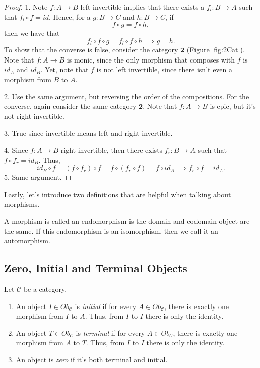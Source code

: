 \begin{proof}
	1. Note $f:A \to B$ left-invertible implies that there exists a $f_l:B \to A$ such that
	$f_l \circ f = id$. Hence, for a $g:B\to C$ and $h: B \to C$, if
	\begin{displaymath}
		f \circ g = f \circ h,
	\end{displaymath}
	then we have that
	\begin{displaymath}
		f_l \circ f \circ g = f_l \circ f \circ h \implies g =h.
	\end{displaymath}
	To show that the converse is false, consider the category $\mathbf{2}$ (Figure \ref{fig:2Cat}). Note that
	$f:A\to B$ is monic, since the only morphism that composes with $f$ is
	$id_A$ and $id_B$. Yet, note that $f$ is not left invertible, since there isn't even
	a morphism from $B$ to $A$.

	2. Use the same argument, but reversing the order of the compositions.
	For the converse, again consider the same category $\mathbf{2}$. Note that
	$f:A\to B$ is epic, but it's not right invertible.

	3. True since invertible means left and right invertible.

	4. Since $f:A \to B$ right invertible, then there exists $f_r:B \to A$
	such that $f \circ f_r = id_B$. Thus,
	\begin{displaymath}
		id_B \circ f = (f \circ f_r) \circ f =
		f \circ (f_r \circ f) =
		f \circ id_A \implies f_r \circ f = id_A.
	\end{displaymath}
	5. Same argument.
\end{proof}

Lastly, let's introduce two definitions that are helpful when talking about morphisms.
\begin{definition}
	A morphism is called an endomorphism is the domain and codomain object are the same.
	If this endomorphism is an isomorphism, then we call it an automorphism.
\end{definition}

\subsection{Zero, Initial and Terminal Objects}

\begin{definition}
	Let $\mathcal C$ be a category.
	\begin{enumerate}[1.]
		\item An object $I \in Ob_\mathcal C$ is \textit{initial} if for every $A \in Ob_\mathcal C$,
		      there is exactly one morphism from $I$ to $A$. Thus, from $I$ to $I$ there is only the identity.
		\item An object $T \in Ob_\mathcal C$ is \textit{terminal} if for every $A \in Ob_\mathcal C$,
		      there is exactly one morphism from $A$ to $T$. Thus, from $I$ to $I$ there is only the identity.
		\item An object is \textit{zero} if it's both terminal and initial.
	\end{enumerate}
\end{definition}

